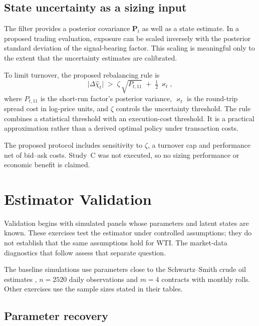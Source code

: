 \documentclass[journal]{IEEEtran}
\begin{document}
\subsection{State uncertainty as a sizing input}
\label{sec:sizing}

The filter provides a posterior covariance $\bm{P}_t$ as well as a state estimate. In a proposed trading evaluation, exposure can be scaled inversely with the posterior standard deviation of the signal-bearing factor. This scaling is meaningful only to the extent that the uncertainty estimates are calibrated.

To limit turnover, the proposed rebalancing rule is
\begin{equation}
  \bigl|\Delta\hat{\chi}_t\bigr| \;>\; \zeta\,\sqrt{P_{t,11}} \;+\; \tfrac{1}{2}\,\varkappa_t ,
  \label{eq:notrade}
\end{equation}
where $P_{t,11}$ is the short-run factor's posterior variance, $\varkappa_t$ is the round-trip spread cost in log-price units, and $\zeta$ controls the uncertainty threshold. The rule combines a statistical threshold with an execution-cost threshold. It is a practical approximation rather than a derived optimal policy under transaction costs.

The proposed protocol includes sensitivity to $\zeta$, a turnover cap and performance net of bid--ask costs. Study~C was not executed, so no sizing performance or economic benefit is claimed.

\section{Estimator Validation}
\label{sec:validation}

Validation begins with simulated panels whose parameters and latent states are known. These exercises test the estimator under controlled assumptions; they do not establish that the same assumptions hold for WTI. The market-data diagnostics that follow assess that separate question.

The baseline simulations use parameters close to the Schwartz--Smith crude oil estimates \cite{SchwartzSmith2000}, $n=2520$ daily observations and $m=4$ contracts with monthly rolls. Other exercises use the sample sizes stated in their tables.

\subsection{Parameter recovery}
\label{sec:recovery}
\end{document}

